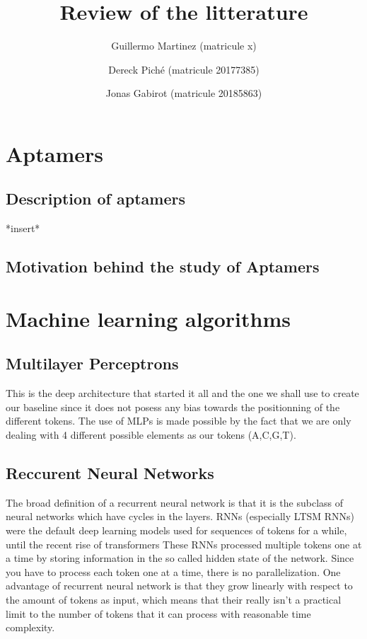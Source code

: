 \documentclass{article}
\title{Review of the litterature}
\author
{
    Guillermo Martinez (matricule x)
    \and
    Dereck Piché (matricule 20177385)
    \and
    Jonas Gabirot (matricule 20185863)
}
\begin{document}
\maketitle

\section*{Aptamers}
\subsection*{Description of aptamers}
*insert*
\subsection*{Motivation behind the study of Aptamers}


\section*{Machine learning algorithms}
\subsection*{Multilayer Perceptrons}
This is the deep architecture that started it all 
and the one we shall use to create our baseline since it does 
not posess any bias towards the positionning of 
the different tokens. The use of MLPs is made possible by the fact 
that we are only dealing with 4 different possible elements as our tokens
(A,C,G,T).

\subsection*{Reccurent Neural Networks}
The broad definition of a recurrent neural network 
is that it is the subclass of neural networks \cite{lstms} which have cycles in the layers. 
RNNs (especially LTSM RNNs) were the default deep learning models used for sequences
of tokens for a while, until the recent rise of transformers 
These RNNs processed multiple tokens one at a time by storing information in the so called
hidden state of the network. Since you have to process each token one at 
a time, there is no parallelization. 
One advantage of recurrent neural network is that they grow 
linearly with respect to the amount of tokens as input, which means 
that their really isn't a practical limit to the number of tokens that
it can process with reasonable time complexity. 
\end{document}
